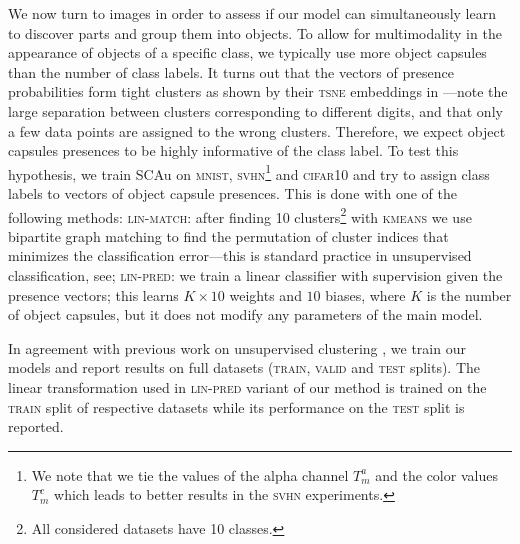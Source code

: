 We now turn to images in order to assess if our model can simultaneously learn to discover parts and group them into objects.
To allow for multimodality in the appearance of objects of a specific class, we typically use more object capsules than the number of class labels. 
It turns out that the vectors of presence probabilities form tight clusters as shown by their \textsc{tsne} embeddings \citep{Maaten2008tsne} in ---note the large separation between clusters corresponding to different digits, and that only a few data points are assigned to the wrong clusters.
Therefore, we expect object capsules presences to be highly informative of the class label.
To test this hypothesis, we train \gls{SCAu} on \textsc{mnist}, \textsc{svhn}\footnote{We note that we tie the values of the alpha channel $T_m^a$ and the color values $T_m^c$ which leads to better results in the \textsc{svhn} experiments.} and \textsc{cifar10} and try to assign class labels to vectors of object capsule presences.
This is done with one of the following methods: 
\textsc{lin-match}: after finding 10 clusters\footnote{All considered datasets have 10 classes.} with \textsc{kmeans} we use bipartite graph matching \citep{Kuhn1955hungarian} to find the permutation of cluster indices that minimizes the classification error---this is standard practice in unsupervised classification, see\eg \cite{Ji2018iic};
\textsc{lin-pred}: we train a linear classifier with supervision given the presence vectors; this learns $K \times 10$ weights and $10$ biases, where $K$ is the number of object capsules, but it does not modify any parameters of the main model.

In agreement with previous work on unsupervised clustering \citep{Ji2018iic,Hu2017imsat,Hjelm2019deepinfomax,Haeusser2018adc}, we train our models and report results on full datasets (\textsc{train}, \textsc{valid} and \textsc{test} splits).
The linear transformation used in \textsc{lin-pred} variant of our method is trained on the \textsc{train} split of respective datasets while its performance on the \textsc{test} split is reported.

